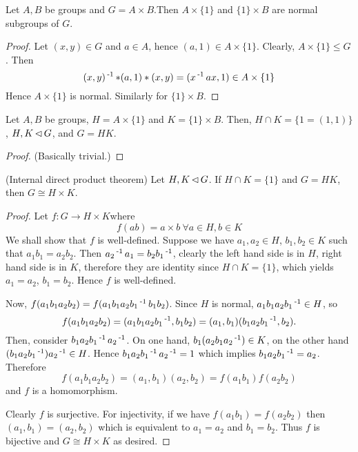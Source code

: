 \documentclass[12pt]{article}
\begin{document}
	\begin{theorem}
		Let $A,B$ be groups and $G=A\times B$.Then $A\times \{1\}$ and $\{1\}\times B$ are normal subgroups of $G$.
	\end{theorem}
	\begin{proof}
		Let $(x,y) \in G$ and $a\in A$, hence $(a,1) \in A\times\{1\}$. Clearly, $A\times\{1\} \leq G$. Then
		$$(x,y)\operatorname{^{-1}} * (a,1) * (x,y) = (x\operatorname{^{-1}} ax,1) \in A\times\{1\}$$
		Hence $A\times\{1\}$ is normal. Similarly for $\{1\}\times B$.
	\end{proof}

	\begin{theorem}
		Let $A,B$ be groups, $H=A\times \{1\}$ and $K=\{1\}\times B$. Then, $H\cap K = \{1=(1,1)\}$, $H,K\operatorname{\vartriangleleft} G$, and $G = HK$.
	\end{theorem}
	\begin{proof}
		(Basically trivial.)
	\end{proof}

	\begin{theorem}\label{direct-product-thm}
		(Internal direct product theorem) Let $H,K\operatorname{\vartriangleleft} G$. If $H\cap K = \{1\}$ and $G=HK$, then $G\cong H\times K$.
	\end{theorem}
	\begin{proof}
		Let $f: G \to H\times K$\footnotemark where
		$$f(ab) = a\times b\ \forall a\in H, b\in K$$
		We shall show that $f$ is well-defined. Suppose we have $a_1, a_2\in H$, $b_1,b_2\in K$ such that $a_1b_1=a_2b_2$. Then $a_2\operatorname{^{-1}} a_1 = b_2b_1\operatorname{^{-1}}$, clearly the left hand side is in $H$, right hand side is in $K$, therefore they are identity since $H\cap K =\{1\}$, which yields $a_1=a_2$, $b_1=b_2$. Hence $f$ is well-defined.

		Now, $f(a_1b_1a_2b_2) = f(a_1 b_1 a_2 b_1\operatorname{^{-1}} b_1 b_2)$. Since $H$ is normal, $a_1 b_1 a_2 b_1\operatorname{^{-1}} \in H$, so
		$$f(a_1b_1a_2b_2) = (a_1 b_1 a_2 b_1\operatorname{^{-1}}, b_1 b_2) = (a_1,b_1)(b_1 a_2 b_1\operatorname{^{-1}}, b_2).$$
		Then, consider $b_1 a_2 b_1\operatorname{^{-1}} a_2\operatorname{^{-1}}$. On one hand, $b_1 (a_2 b_1 a_2\operatorname{^{-1}}) \in K$, on the other hand $(b_1 a_2 b_1\operatorname{^{-1}}) a_2\operatorname{^{-1}} \in H$. Hence $b_1 a_2 b_1\operatorname{^{-1}} a_2\operatorname{^{-1}} = 1$ which implies $b_1 a_2 b_1\operatorname{^{-1}} = a_2$.
		Therefore
		$$f(a_1b_1a_2b_2)= (a_1,b_1)(a_2,b_2) = f(a_1b_1)f(a_2b_2)$$
		and $f$ is a homomorphism.

		Clearly $f$ is surjective. For injectivity, if we have $f(a_1b_1)=f(a_2b_2)$ then $(a_1,b_1)=(a_2,b_2)$ which is equivalent to $a_1=a_2$ and $b_1=b_2$. Thus $f$ is bijective and $G\cong H\times K$ as desired.
	\end{proof}
\end{document}
